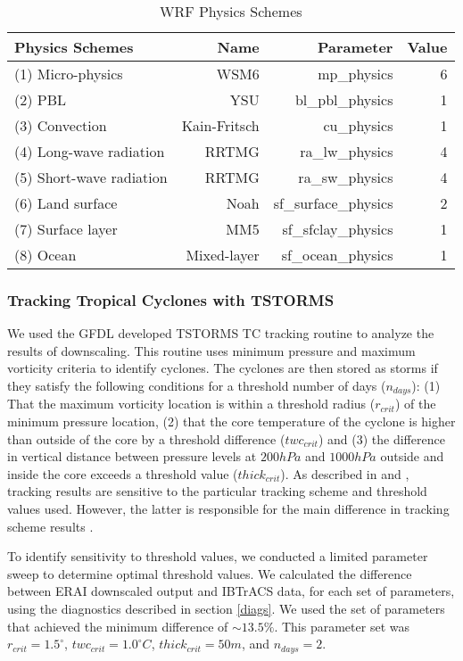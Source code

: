 \begin{table}[!tbp]
\centering
\begin{tabular}{lrrr}
\toprule
             Physics Schemes &  Name & Parameter & Value \\ 
\midrule
            (1) Micro-physics &     WSM6 &  mp\_physics & 6 \\  
            (2) PBL &    YSU &  bl\_pbl\_physics &  1 \\    
            (3) Convection &   Kain-Fritsch &  cu\_physics & 1 \\    
            (4) Long-wave radiation &    RRTMG &   ra\_lw\_physics & 4 \\    
            (5) Short-wave radiation &    RRTMG &   ra\_sw\_physics & 4 \\    
            (6) Land surface &   Noah &   sf\_surface\_physics & 2 \\    
            (7) Surface layer &    MM5 &  sf\_sfclay\_physics &  1 \\    
            (8) Ocean &    Mixed-layer &  sf\_ocean\_physics &  1 \\    
\bottomrule
\end{tabular}
\caption{WRF Physics Schemes}
\label{wrf_specs}
\end{table}

\subsubsection{Tracking Tropical Cyclones with TSTORMS}
\label{tstorms}
We used the GFDL developed TSTORMS \cite{tc_algo} TC tracking routine to analyze the results of downscaling. This routine uses minimum pressure and maximum vorticity criteria to identify cyclones. The cyclones are then stored as storms if they satisfy the following conditions for a threshold number of days ($n_{days}$): (1) That the maximum vorticity location is within a threshold radius ($r_{crit}$) of the minimum pressure location, (2) that the core temperature of the cyclone is higher than outside of the core by a threshold difference ($twc_{crit}$) and (3) the difference in vertical distance between pressure levels at $200hPa$ and $1000hPa$ outside and inside the core exceeds a threshold value ($thick_{crit}$). As described in \cite{kerry_clivar} and \cite{tc_algo}, tracking results are sensitive to the particular tracking scheme and threshold values used. However, the latter is responsible for the main difference in tracking scheme results \cite{tc_track}. 
\par
To identify sensitivity to threshold values, we conducted a limited parameter sweep to determine optimal threshold values. We calculated the difference between ERAI downscaled output and IBTrACS data, for each set of parameters, using the diagnostics described in section \ref{diags}. We used the set of parameters that achieved the minimum difference of ${\sim}13.5\%$. This parameter set was $r_{crit} = 1.5^{\circ}$, $twc_{crit} = 1.0^{\circ}C$, $thick_{crit} = 50m$, and $n_{days} = 2$.  

